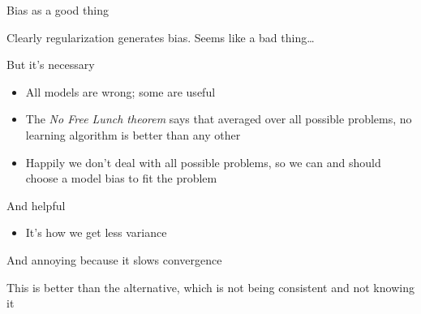 \documentclass{hertieteaching}
\begin{document}
\begin{frame}{Bias as a good thing}

Clearly regularization generates bias. Seems like a bad thing\ldots

But it's necessary
\begin{itemize}
  \item All models are wrong; some are useful
  \item The \textit{No Free Lunch theorem} \parencite{Wolpert1996a} says that averaged over all possible problems, no learning algorithm is better than any other
  \item Happily we don't deal with all possible problems, so we can and should choose a model bias to fit the problem
\end{itemize} 
And helpful
\begin{itemize}
  \item It's how we get less variance
\end{itemize} 
And annoying because it slows convergence 

This is better than the alternative, which is not being consistent and not knowing it

\end{frame}

%
%
%
%
%
%
%
%
%
\end{document}
